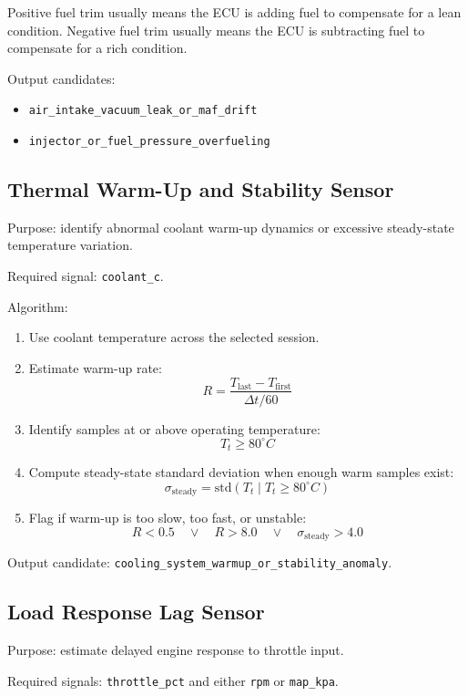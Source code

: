 \documentclass[11pt,a4paper]{article}
\begin{document}
Positive fuel trim usually means the ECU is adding fuel to compensate for a lean condition. Negative fuel trim usually means the ECU is subtracting fuel to compensate for a rich condition.

Output candidates:

\begin{itemize}
\item \texttt{air\_intake\_vacuum\_leak\_or\_maf\_drift}
\item \texttt{injector\_or\_fuel\_pressure\_overfueling}
\end{itemize}

\subsection{Thermal Warm-Up and Stability Sensor}

Purpose: identify abnormal coolant warm-up dynamics or excessive steady-state temperature variation.

Required signal: \texttt{coolant\_c}.

Algorithm:

\begin{enumerate}
\item Use coolant temperature across the selected session.
\item Estimate warm-up rate:
\[
R = \frac{T_{\mathrm{last}} - T_{\mathrm{first}}}{\Delta t / 60}
\]
\item Identify samples at or above operating temperature:
\[
T_t \geq 80^\circ C
\]
\item Compute steady-state standard deviation when enough warm samples exist:
\[
\sigma_{\mathrm{steady}} = \mathrm{std}(T_t \mid T_t \geq 80^\circ C)
\]
\item Flag if warm-up is too slow, too fast, or unstable:
\[
R < 0.5 \quad \lor \quad R > 8.0 \quad \lor \quad \sigma_{\mathrm{steady}} > 4.0
\]
\end{enumerate}

Output candidate: \texttt{cooling\_system\_warmup\_or\_stability\_anomaly}.

\subsection{Load Response Lag Sensor}

Purpose: estimate delayed engine response to throttle input.

Required signals: \texttt{throttle\_pct} and either \texttt{rpm} or \texttt{map\_kpa}.
\end{document}
